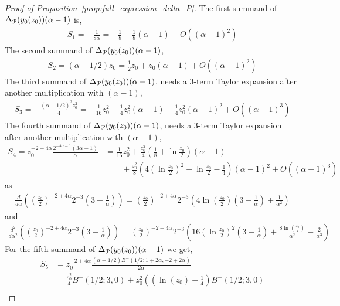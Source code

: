 \begin{proof}[Proof of Proposition~\ref{prop:full_expression_delta_P}]
The first summand of $\Delta_{{\mathcal P}}(y_0(z_0))(\alpha-1)$ is,
\begin{align*}
	S_1 = -\frac{1}{8 \alpha} = -\frac{1}{8}+\frac{1}{8}(\alpha-1) +O( (\alpha-1)^2)
\end{align*}
The second summand of $\Delta_{{\mathcal P}}(y_0(z_0))(\alpha-1)$,
\begin{align*}
	S_2 = (\alpha-1/2)z_0 = \frac{1}{2}z_0 +z_0 (\alpha-1)+O( (\alpha-1)^2)
\end{align*}
The third summand of $\Delta_{{\mathcal P}}(y_0(z_0))(\alpha-1)$, needs a 3-term Taylor expansion after another multiplication with $(\alpha-1)$,
\begin{align*}
	S_3 = - \frac{(\alpha - 1/2)^2 z_0^2}{4} = -\frac{1}{16}z_0^2 -\frac{1}{4}z_0^2(\alpha-1)-\frac{1}{4}z_0^2(\alpha-1)^2+O( (\alpha-1)^3)
\end{align*}
The fourth summand of $\Delta_{{\mathcal P}}(y_0(z_0))(\alpha-1)$, needs a  3-term Taylor expansion after another multiplication with $(\alpha-1)$,
\begin{align*}
	S_4 = z_0^{-2 + 4 \alpha} \frac{2^{-4 \alpha-1} (3 \alpha - 1)}{\alpha} &= \frac{1}{16}z_0^2 +\frac{z_0^2}{4}\left(\frac{1}{8}+\ln\frac{z_0}{2}\right)(\alpha-1)\\
&\qquad+\frac{z_0^2}{8}\left(4\left(\ln\frac{z_0}{2}\right)^2+\ln\frac{z_0}{2} - \frac{1}{4}\right)(\alpha-1)^2+O( (\alpha-1)^3)
\end{align*}
as
\begin{align*}
\frac{d}{d\alpha}\left( \left(\frac{z_0}{2}\right)^{-2+4\alpha} 2^{-3}\left(3-\frac{1}{\alpha}\right) \right) = \left(\frac{z_0}{2}\right)^{-2+4\alpha}2^{-3}\left(4\ln\left(\frac{z_0}{2}\right)\left(3-\frac{1}{\alpha}\right)+\frac{1}{\alpha^2}\right)
\end{align*}
and
\begin{align*}
\frac{d^2}{d\alpha^2}\left( \left(\frac{z_0}{2}\right)^{-2+4\alpha} 2^{-3}\left(3-\frac{1}{\alpha}\right) \right) = \left( \frac{z_0}{2} \right)^{-2+4\alpha}2^{-3}\left(16\left(\ln\frac{z_0}{2}\right)^2\left(3-\frac{1}{\alpha}\right)+\frac{8\ln(\frac{z_0}{2})}{\alpha^2}-\frac{2}{\alpha^3} \right)
\end{align*}
For the fifth summand of $\Delta_{{\mathcal P}}(y_0(z_0))(\alpha-1)$ we get,
\begin{align*}
	S_5 &= z_0^{-2 + 4 \alpha} \frac{(\alpha - 1/2 ) B^-(1/2; 1 + 2 \alpha, -2 + 2 \alpha)}{2\alpha} \\
	&= \frac{z_0^2}{4} B^-(1/2;3,0) + z_0^2\left(\left(\ln(z_0)+\frac{1}{4}\right) B^-(1/2;3,0) \right. \\

\end{align*}
\end{proof}
